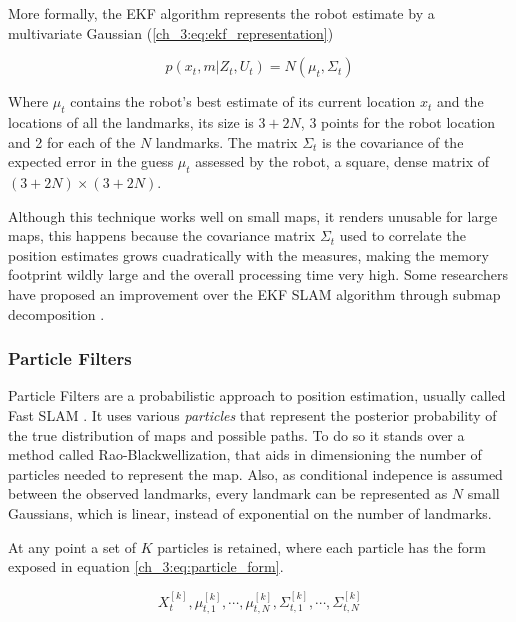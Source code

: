       More formally, the EKF algorithm represents the robot estimate by a multivariate Gaussian (\ref{ch_3:eq:ekf_representation})
      
      \begin{equation} \label{ch_3:eq:ekf_representation}
        p(x_{t}, m | Z_{t}, U_{t}) = N(\mu_{t}, \Sigma_{t})
      \end{equation}

      Where $\mu_{t}$ contains the robot's best estimate of its current location $x_{t}$ and the locations of all the landmarks, its size is $3 + 2N$, 3 points for the robot location and 2 for each of the $N$ landmarks. The matrix $\Sigma_{t}$ is the covariance of the expected error in the guess $\mu_{t}$ assessed by the robot, a square, dense matrix of $(3 + 2N) \times (3 + 2N)$.

      Although this technique works well on small maps, it renders unusable for large maps, this happens because the covariance matrix $\Sigma_{t}$ used to correlate the position estimates grows cuadratically with the measures, making the memory footprint wildly large and the overall processing time very high. Some researchers have proposed an improvement over the EKF SLAM algorithm through submap decomposition \cite{Guivant2001, Leonard2000}.

    \subsubsection{Particle Filters}

      Particle Filters are a probabilistic approach to position estimation, usually called Fast SLAM \cite{Montemerlo2002}. It uses various \textit{particles} that represent the posterior probability of the true distribution of maps and possible paths. To do so it stands over a method called Rao-Blackwellization, that aids in dimensioning the number of particles needed to represent the map. Also, as conditional indepence is assumed between the observed landmarks, every landmark can be represented as $N$ small Gaussians, which is linear, instead of exponential on the number of landmarks.

      At any point a set of $K$ particles is retained, where each particle has the form exposed in equation \ref{ch_3:eq:particle_form}.

      \begin{equation} \label{ch_3:eq:particle_form}
        X_{t}^{[k]}, \mu_{t,1}^{[k]}, \cdots, \mu_{t,N}^{[k]}, \Sigma_{t,1}^{[k]}, \cdots, \Sigma_{t,N}^{[k]}
      \end{equation}

